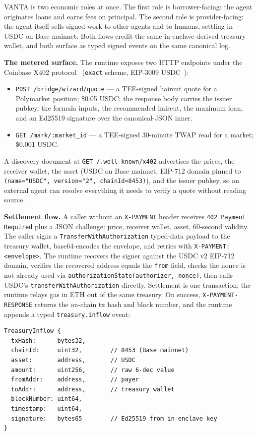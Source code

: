 \documentclass[11pt,letterpaper]{article}
\begin{document}
VANTA is two economic roles at once. The first role is borrower-facing: the agent originates loans and earns fees on principal. The second role is provider-facing: the agent itself sells signed work to other agents and to humans, settling in USDC on Base mainnet. Both flows credit the same in-enclave-derived treasury wallet, and both surface as typed signed events on the same canonical log.

\textbf{The metered surface.} The runtime exposes two HTTP endpoints under the Coinbase X402 protocol~\cite{coinbase-x402} (\texttt{exact} scheme, EIP-3009 USDC~\cite{eip3009}):

\begin{itemize}[leftmargin=*,itemsep=2pt,topsep=2pt]
  \item \texttt{POST /bridge/wizard/quote} --- a TEE-signed haircut quote for a Polymarket position; \$0.05 USDC; the response body carries the issuer pubkey, the formula inputs, the recommended haircut, the maximum loan, and an Ed25519 signature over the canonical-JSON inner.
  \item \texttt{GET /mark/:market\_id} --- a TEE-signed 30-minute TWAP read for a market; \$0.001 USDC.
\end{itemize}

A discovery document at \texttt{GET /.well-known/x402} advertises the prices, the receiver wallet, the asset (USDC on Base mainnet, EIP-712 domain pinned to \texttt{(name="USDC", version="2", chainId=8453)}), and the issuer pubkey, so an external agent can resolve everything it needs to verify a quote without reading source.

\textbf{Settlement flow.} A caller without an \texttt{X-PAYMENT} header receives \texttt{402 Payment Required} plus a JSON challenge: price, receiver wallet, asset, 60-second validity. The caller signs a \texttt{TransferWithAuthorization} typed-data payload to the treasury wallet, base64-encodes the envelope, and retries with \texttt{X-PAYMENT: <envelope>}. The runtime recovers the signer against the USDC v2 EIP-712 domain, verifies the recovered address equals the \texttt{from} field, checks the nonce is not already used via \texttt{authorizationState(authorizer, nonce)}, then calls USDC's \texttt{transferWithAuthorization} directly. Settlement is one transaction; the runtime relays gas in ETH out of the same treasury. On success, \texttt{X-PAYMENT-RESPONSE} returns the on-chain tx hash and block number, and the runtime appends a typed \texttt{treasury.inflow} event:

\begin{lstlisting}
TreasuryInflow {
  txHash:      bytes32,
  chainId:     uint32,        // 8453 (Base mainnet)
  asset:       address,       // USDC
  amount:      uint256,       // raw 6-dec value
  fromAddr:    address,       // payer
  toAddr:      address,       // treasury wallet
  blockNumber: uint64,
  timestamp:   uint64,
  signature:   bytes65        // Ed25519 from in-enclave key
}
\end{lstlisting}
\end{document}
